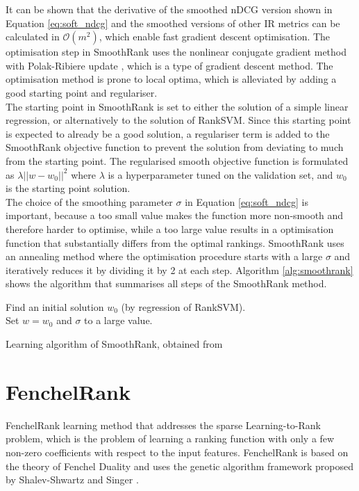 It can be shown that the derivative of the smoothed \ac{nDCG} version shown in Equation \ref{eq:soft_ndcg} and the smoothed versions of other \ac{IR} metrics can be calculated in $\mathcal{O}(m^2)$, which enable fast gradient descent optimisation. The optimisation step in SmoothRank uses the nonlinear conjugate gradient method  with Polak-Ribiere update \cite{Shewchuk1994}, which is a type of gradient descent method. The optimisation method is prone to local optima, which is alleviated by adding a good starting point and regulariser.\\

The starting point in SmoothRank is set to either the solution of a simple linear regression, or alternatively to the solution of Rank\acs{SVM}. Since this starting point is expected to already be a good solution, a regulariser term is added to the SmoothRank objective function to prevent the solution from deviating to much from the starting point. The regularised smooth objective function is formulated as $\lambda||w-w_0||^2$ where $\lambda$ is a hyperparameter tuned on the validation set, and $w_0$ is the starting point solution.\\

The choice of the smoothing parameter $\sigma$ in Equation \ref{eq:soft_ndcg} is important, because a too small value makes the function more non-smooth and therefore harder to optimise, while a too large value results in a optimisation function that substantially differs from the optimal rankings. SmoothRank uses an annealing method where the optimisation procedure starts with a large $\sigma$ and iteratively reduces it by dividing it by 2 at each step. Algorithm \ref{alg:smoothrank} shows the algorithm that summarises all steps of the SmoothRank method.\\
\LinesNumbered
\begin{algorithm}[H]
 Find an initial solution $w_0$ (by regression of Rank\acs{SVM}).\\
 Set $w = w_0$ and $\sigma$ to a large value.\\
 \caption{Learning algorithm of SmoothRank, obtained from \cite{Chapelle2010}}
 \label{alg:smoothrank}
\end{algorithm}

\section{FenchelRank}
FenchelRank \cite{Lai2013} learning method that addresses the sparse Learning-to-Rank problem, which is the problem of learning a ranking function with only a few non-zero coefficients with respect to the input features. FenchelRank is based on the theory of Fenchel Duality \cite{Rifkin2007} and uses the genetic algorithm framework proposed by Shalev-Shwartz and Singer \cite{Shalev-Shwartz2010}.\\

